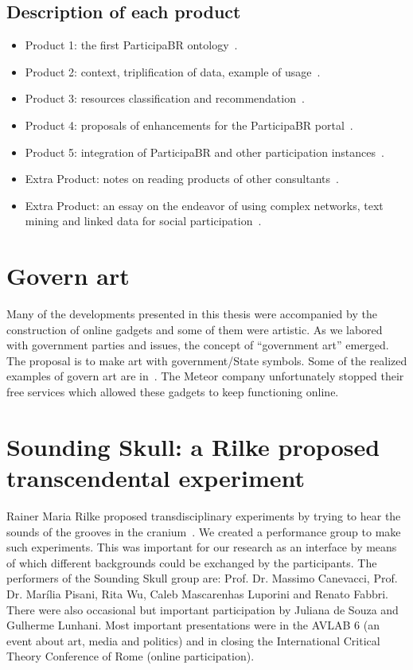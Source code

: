 \begin{apendicesenv}
\subsection{Description of each product}
\begin{itemize}
	\item Product 1: the first ParticipaBR ontology~\cite{opa0}.
	\item Product 2: context, triplification of data, example of usage~\cite{pnud2}.
	\item Product 3: resources classification and recommendation~\cite{pnud3}.
	\item Product 4: proposals of enhancements for the ParticipaBR portal~\cite{pnud4}.
	\item Product 5: integration of ParticipaBR and other participation instances~\cite{opa}.
	\item Extra Product: notes on reading products of other consultants~\cite{pnudExtra}.
	\item Extra Product: an essay on the endeavor of using complex networks, text mining and linked data for social participation~\cite{ensaio}.
\end{itemize}

\section{Govern art}\label{sec:govArt}
Many of the developments presented in this thesis were accompanied by the construction of online gadgets
and some of them were artistic.
As we labored with government parties and issues,
the concept of ``government art'' emerged.
The proposal is to make art with government/State symbols.
Some of the realized examples of govern art are in~\cite{aars}.
The Meteor company unfortunately stopped their free services which
allowed these gadgets to keep functioning online.

\section{Sounding Skull: a Rilke proposed transcendental experiment}\label{sec:soundSkull}
Rainer Maria Rilke proposed transdisciplinary experiments by trying to hear the
sounds of the grooves in the cranium~\cite{rilke}.
We created a performance group to make such experiments.
This was important for our research as an interface
by means of which different backgrounds could be exchanged by the participants.
The performers of the Sounding Skull group are:
Prof. Dr. Massimo Canevacci, Prof. Dr. Marília Pisani,
Rita Wu, Caleb Mascarenhas Luporini and Renato Fabbri.
There were also occasional but important participation
by Juliana de Souza and Gulherme Lunhani.
Most important presentations were in the AVLAB 6 (an event about art, media and politics)
and in closing the International Critical Theory Conference of Rome (online participation).


\end{apendicesenv}
